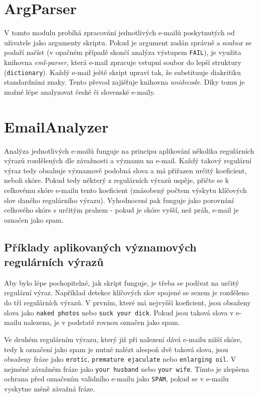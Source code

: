 \documentclass[12pt]{article}
\begin{document}
\section{ArgParser}

V tomto modulu probíhá zpracování jednotlivých e-mailů poskytnutých od uživatele jako argumenty skriptu. Pokud je argument zadán správně a soubor se podaří načíst (v opačném případě skončí analýza výstupem \verb|FAIL|), je využita knihovna \textit{eml-parser}, která e-mail zpracuje vstupní soubor do lepší struktury (\verb|dictionary|). Každý e-mail ještě skript upraví tak, že substituuje diakritiku standardními znaky. Tento převod zajišťuje knihovna \textit{unidecode}. Díky tomu je možné lépe analyzovat české či slovenské e-maily.

\section{EmailAnalyzer}

Analýza jednotlivých e-mailů funguje na principu aplikování několika regulárních výrazů rozdělených dle závažnosti a významu na e-mail. Každý takový regulární výraz tedy obsahuje významově podobná slova a má přiřazen určitý koeficient, neboli skóre. Pokud tedy některý z regulárních výrazů uspěje, přičte se k celkovému skóre e-mailu tento koeficient (znásobený počtem výskytu klíčových slov daného regulárního výrazu). Vyhodnocení pak funguje jako porovnání celkového skóre s určitým prahem - pokud je skóre vyšší, než práh, e-mail je označen jako spam.

\subsection{Příklady aplikovaných významových regulárních výrazů}

Aby bylo lépe pochopitelné, jak skript funguje, je třeba se podívat na určitý regulární výraz. Například detekce klíčových slov spojené se sexem je rozděleno do tří regulárních výrazů. V prvním, které má nejvyšší koeficient, jsou obsaženy slova jako \verb|naked photos| nebo \verb|suck your dick|. Pokud jsou taková slova v e-mailu nalezena, je v podstatě rovnou označen jako spam.

Ve druhém regulárním výrazu, který již při nalezení dává e-mailu nižší skóre, tedy k označení jako spam je nutné nalézt alespoň dvě taková slova, jsou obsaženy fráze jako \verb|erotic|, \verb|premature ejaculate| nebo \verb|enlarging oil|. V nejméně závažném fráze jako \verb|your husband| nebo \verb|your wife|. Tímto je zlepšena ochrana před označením validního e-mailu jako \verb|SPAM|, pokud se v e-mailu vyskytne méně závažná fráze.
\end{document}
